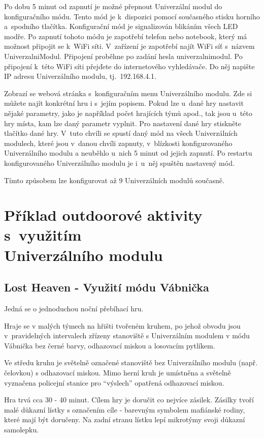 Po dobu 5 minut od zapnutí je možné přepnout Univerzální modul do konfiguračního módu. Tento mód je k~dispozici pomocí současného stisku horního a~spodního tlačítka. Konfigurační mód je signalizován blikáním všech 
LED modře. Po zapnutí tohoto módu je zapotřebí telefon 
nebo notebook, který má možnost připojit se k~WiFi síti. V~zařízení je zapotřebí najít WiFi síť s~názvem UniverzalniModul. Připojení proběhne po zadání hesla univerzalnimodul. Po připojení k~této WiFi síti přejďete 
do internetového vyhledávače. Do něj napište IP adresu Univerzálního modulu, tj.~192.168.4.1. 

Zobrazí se webová stránka s~konfiguračním menu Univerzálního modulu. Zde si můžete najít konkrétní hru i s~jejím popisem. Pokud lze u~dané hry nastavit nějaké parametry, jako je například počet hrajících týmů apod., tak 
jsou u~této hry místa, kam lze daný parametr vyplnit. Pro nastavení dané hry stiskněte tlačítko dané hry. V~tuto chvíli se spustí daný mód na všech Univerzálních modulech, 
které jsou v~danou chvíli zapnuty, v~blízkosti konfigurovaného Univerzálního modulu a neuběhlo u~nich 5 minut od jejich zapnutí. Po restartu konfigurovaného Univerzálního modulu je i~u~něj spuštěn nastavený mód. 

Tímto způsobem lze konfigurovat až 9 Univerzálních modulů současně. 

\chapter{Příklad outdoorové aktivity s~využitím \\Univerzálního modulu}
\section{Lost Heaven - Využití módu Vábnička}
Jedná se o jednoduchou noční přebíhací hru.

Hraje se v malých týmech na hřišti tvořeném kruhem, po jehož obvodu jsou v~pravidelných intervalech zřízeny stanoviště s Univerzálním modulem v módu Vábnička bez černé barvy, odhazovací miskou a losovacím pytlíkem. 

Ve středu kruhu je světelně označené stanoviště bez Univerzálního modulu (např. čelovkou) s odhazovací miskou. Mimo herní kruh je umístněna a světelně vyznačena policejní stanice pro “výslech” opatřená odhazovací miskou. 

Hra trvá cca 30 - 40 minut. Cílem hry je doručit co nejvíce zásilek. Zásilky tvoří malé důkazní lístky s označením cíle - barevným symbolem mafiánské rodiny, které mají být doručeny. Na zadní stranu lístku lepí mikrotýmy 
svoji důkazní samolepku. 

